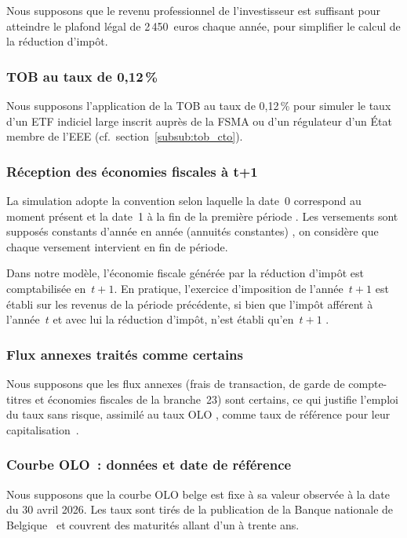 ﻿\documentclass[12pt, a4paper]{article}
\begin{document}
Nous supposons que le revenu professionnel de l'investisseur est suffisant pour atteindre
le plafond légal de 2\,450~euros chaque année, pour simplifier le calcul de la réduction
d'impôt.

\subsubsection*{TOB au taux de 0,12\,\%}

Nous supposons l'application de la TOB au taux de 0,12\,\% pour simuler le taux d'un
ETF indiciel large inscrit auprès de la FSMA ou d'un régulateur d'un État
membre de l'EEE (cf.~section~\ref{subsub:tob_cto}).

\subsubsection*{Réception des économies fiscales à t+1}

La simulation adopte la convention selon laquelle la date~0 correspond au moment
présent et la date~1 à la fin de la première période \cite[p.~94]{berk2020}.
Les versements sont supposés constants d'année en année (annuités constantes) \cite[p.~108]{berk2020},
on considère que chaque versement intervient en fin de période. 

Dans notre modèle, l'économie fiscale générée par la réduction d'impôt est
comptabilisée en~$t+1$. En pratique, l'exercice d'imposition de l'année~$t+1$ est établi sur
les revenus de la période précédente, si bien que l'impôt afférent à l'année~$t$
et avec lui la réduction d'impôt, n'est établi qu'en~$t+1$ \cite[art.~360]{cir92_2025}.

\subsubsection*{Flux annexes traités comme certains}
Nous supposons que les flux annexes (frais de transaction, de garde de compte-titres
et économies fiscales de la branche~23) sont certains, ce qui justifie l'emploi
du taux sans risque, assimilé au taux OLO \cite{Streel2017}, comme taux de référence pour leur capitalisation~\cite[p.~156]{berk2020}.

\subsubsection*{Courbe OLO~: données et date de référence}
Nous supposons que la courbe OLO belge est fixe à sa valeur observée à la date
du 30 avril 2026. Les taux sont tirés de
la publication de la Banque nationale de Belgique~\cite{bnb_olo} et couvrent
des maturités allant d'un à trente ans.
\end{document}
